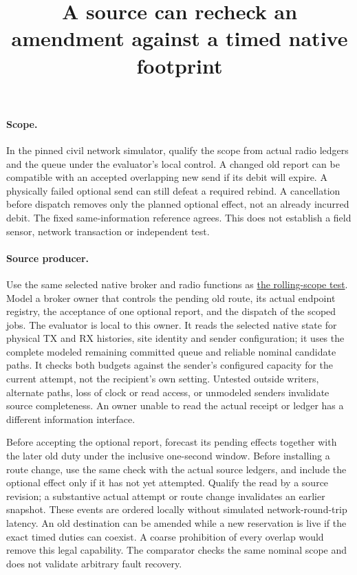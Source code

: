 \documentclass[11pt]{article}
\title{A source can recheck an amendment against a timed native footprint}
\date{}
\begin{document}
\maketitle

\paragraph{Scope.}
In the pinned civil network simulator, qualify the scope from actual
radio ledgers and the queue under the evaluator's local control.
A changed old report can be compatible with an accepted overlapping
new send if its debit will expire. A physically failed optional send
can still defeat a required rebind. A cancellation before dispatch
removes only the planned optional effect, not an already incurred
debit. The fixed same-information reference agrees. This does not
establish a field sensor, network transaction or independent test.

\paragraph{Source producer.}
Use the same selected native broker and radio functions as
\href{https://github.com/eternal-november/eos-research-programmes/pull/587}
{the rolling-scope test}. Model a broker owner that controls the
pending old route, its actual endpoint registry, the acceptance
of one optional report, and the dispatch of the scoped jobs.
The evaluator is local to this owner. It reads the selected native
state for physical TX and RX histories, site identity and sender
configuration; it uses the complete modeled remaining committed
queue and reliable nominal candidate paths. It checks both budgets
against the sender's configured capacity for the current attempt,
not the recipient's own setting. Untested outside writers, alternate
paths, loss of clock or read access, or unmodeled senders invalidate
source completeness. An owner unable to read the actual receipt
or ledger has a different information interface.

Before accepting the optional report, forecast its pending effects
together with the later old duty under the inclusive one-second
window. Before installing a route change, use the same check with
the actual source ledgers, and include the optional effect only if
it has not yet attempted. Qualify the read by a source revision;
a substantive actual attempt or route change invalidates an earlier
snapshot. These events are ordered locally without simulated
network-round-trip latency. An old destination can be amended while
a new reservation is live if the exact timed duties can coexist.
A coarse prohibition of every overlap would remove this legal
capability. The comparator checks the same nominal scope and does
not validate arbitrary fault recovery.
\end{document}

